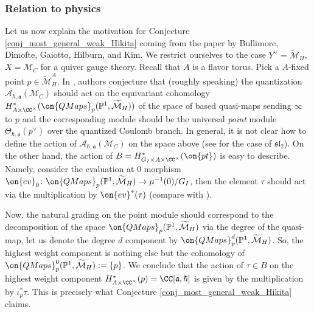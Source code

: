 \documentclass[12pt]{amsart}
\begin{document}
\subsubsection{Relation to physics} Let us now explain the motivation for Conjecture \ref{conj_most_general_weak_Hikita} coming from the paper \cite{votices_vermas} by Bullimore, Dimofte, Gaiotto, Hilburn, and Kim.  We restrict ourselves to the case $Y^\vee=\widetilde{\mathcal{M}}_H$, $X=\mathcal{M}_C$ for a quiver gauge theory. Recall that $A$ is a flavor torus. 
Pick a $A$-fixed point $p \in \widetilde{\mathcal{M}}_H^{A}$.
In \cite{votices_vermas}, authors conjecture that (roughly speaking) the quantization $\mathcal{A}_{\hbar,\mathfrak{a}}(\mathcal{M}_C)$ should act on the equivariant  cohomology $H^*_{A \times \CC^\times}(\on{QMaps}_{p}(\mathbb{P}^1,\widetilde{\mathcal{M}}_H))$ of the space of based quasi-maps sending $\infty$ to $p$ and the corresponding module should be the universal {\emph{point}} module $\Theta_{\hbar,\mathfrak{a}}(p^{\vee})$ over the quantized Coulomb branch. In general, it is not clear how to define the action of $\mathcal{A}_{\hbar,\mathfrak{a}}(\mathcal{M}_C)$ on the space above (see \cite{tamagni} for the case of $\mathfrak{sl}_2$). On the other hand, the action of $B=H^*_{G_I \times A \times \CC^\times}(\on{pt})$ is easy to describe. Namely, consider the evaluation at $0$ morphism $\on{ev}_0\colon \on{QMaps}_{p}(\mathbb{P}^1,\widetilde{\mathcal{M}}_H) \rightarrow \mu^{-1}(0)/G_{I}$, then the element $\tau$ should act via the multiplication by $\on{ev}^*(\tau)$ (compare with \cite{l}).



Now, the natural grading on the point module should correspond to the decomposition of the space  $\on{QMaps}_{p}(\mathbb{P}^1,\widetilde{\mathcal{M}}_H)$ via the degree of the quasi-map, let us denote the degree $d$ component by $\on{QMaps}_{p}^d(\mathbb{P}^1,\widetilde{\mathcal{M}}_H)$. So, the highest weight component is nothing else but the cohomology of $\on{QMaps}_{p}^0(\mathbb{P}^1,\widetilde{\mathcal{M}}_H):=\{p\}$. We conclude that the action of $\tau \in B$ on the highest weight component $H^*_{A \times \CC^\times}(p)=\CC[\mathfrak{a},\hbar]$ is given by the multiplication by $\iota_{p}^*\tau$. This is precisely what Conjecture \ref{conj_most_general_weak_Hikita} claims.  
\end{document}
